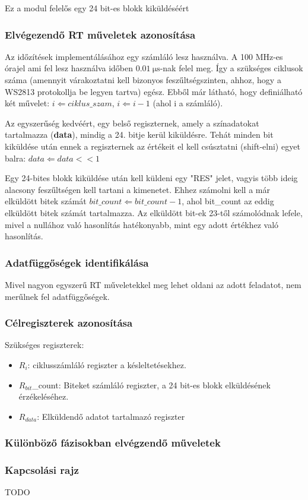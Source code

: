 Ez a modul felelős egy 24 bit-es blokk kiküldéséért 


\subsubsection{Elvégezendő RT műveletek azonosítása}

Az időzítések implementálásához egy számláló lesz használva. A 100 MHz-es órajel ami fel lesz használva időben $\SI{0.01}{\micro\second}$-nak felel meg. 
Így a szükséges ciklusok száma (amennyit várakoztatni kell bizonyos feszűltségszinten, ahhoz, hogy a WS2813 protokollja be legyen tartva) egész.
Ebből már látható, hogy definiálható két művelet: $i \Leftarrow ciklus\_szam$, $i \Leftarrow i - 1$ (ahol i a számláló).

\indent Az egyszerűség kedvéért, egy belső regiszternek, amely a színadatokat tartalmazza (\textbf{data}), mindig a 24. bitje kerül kiküldésre.
Tehát minden bit kiküldése után ennek a regiszternek az értékeit el kell csúsztatni (shift-elni) egyet balra: $data \Leftarrow data << 1$

\indent Egy 24-bites blokk kiküldése után kell küldeni egy "RES" jelet, vagyis több ideig alacsony feszűltségen kell tartani a kimenetet. 
Ehhez számolni kell a már elküldött bitek számát $bit\_count \Leftarrow bit\_count - 1$, ahol bit\_count az eddig elküldött bitek számát tartalmazza.
Az elküldött bit-ek 23-től számolódnak lefele, mivel a nullához való hasonlítás hatékonyabb, mint egy adott értékhez való hasonlítás.

\subsubsection{Adatfüggőségek identifikálása}

Mivel nagyon egyszerű RT műveletekkel meg lehet oldani az adott feladatot, nem merűlnek fel adatfüggőségek.

\subsubsection{Célregiszterek azonosítása}

Szükséges regiszterek:
\begin{itemize}
	\item $R_i$: ciklusszámláló regiszter a késleltetésekhez.
	\item $R_{bit}$\_count: Biteket számláló regiszter, a 24 bit-es blokk elküldésének érzékeléséhez.
	\item $R_{data}$: Elküldendő adatot tartalmazó regiszter
\end{itemize}

\subsubsection{Különböző fázisokban elvégzendő műveletek}



\subsubsection{Kapcsolási rajz}

TODO